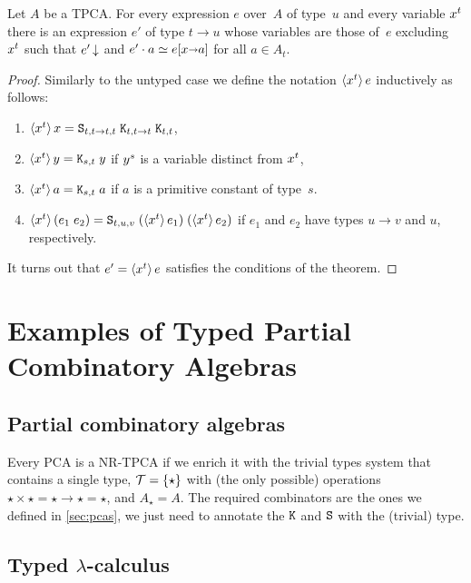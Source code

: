 \begin{theorem}
  Let $A$ be a TPCA. For every expression $e$ over~$A$ of type~$u$ and
  every variable $x^{t}$ there is an expression $e'$ of type $t
  \to u$ whose variables are those of~$e$ excluding~$x^{t}$
  such that $e'\,{\downarrow}$ and $e' \cdot a \simeq e[x {\shortrightarrow}
    a]$ for all $a \in A_t$.
\end{theorem}

\begin{proof}
  Similarly to the untyped case we define the notation
  $\langle x^{t} \rangle\,e$ inductively as follows:
  \begin{enumerate}
  \item $\langle x^{t} \rangle\,x = \mathtt{S}_{t,t \to t,t} \; \mathtt{K}_{t,t \to
      t} \; \mathtt{K}_{t,t}$,
  \item $\langle x^{t} \rangle\,y = \mathtt{K}_{s,t}\; y$ if $y^{s}$ is a
    variable distinct from $x^{t}$,
  \item $\langle x^{t} \rangle\,a = \mathtt{K}_{s,t} \; a$ if $a$ is a primitive
    constant of type~$s$.
  \item $\langle x^{t} \rangle\,(e_1\; e_2) = \mathtt{S}_{t,u,v}\;
    (\langle x^{t} \rangle\,e_1) \; (\langle x^{t} \rangle\,e_2)$ if $e_1$ and
    $e_2$ have types $u \to v$ and $u$, respectively.
  \end{enumerate}
  It turns out that $e' = \langle x^{t} \rangle\,e$ satisfies the conditions
  of the theorem.
\end{proof}

\section{Examples of Typed Partial Combinatory Algebras}
\label{sec:examples-tpcas}

\subsection{Partial combinatory algebras}

Every PCA is a NR-TPCA if we enrich it with the trivial types system
that contains a single type, $\mathcal{T} = \{\star\}$ with (the
only possible) operations $\star \times \star = \star \to \star =
\star$, and $A_\star = A$. The required combinators are the ones we
defined in \cref{sec:pcas}, we just need to annotate the
$\mathtt{K}$ and $\mathtt{S}$ with the (trivial) type.


\subsection[\texorpdfstring%
{Typed $\lambda$-calculus}%
{Typed lambda-calculus}%
]{Typed $\lambda$-calculus}
\label{sec:typed-lambda-calculus}


